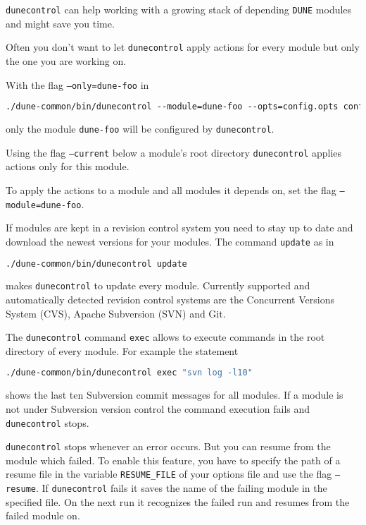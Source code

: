 \documentclass[11pt,a4paper,headinclude,footinclude,DIV16,normalheadings]{scrartcl}
\newcommand{\dune}{\texttt{DUNE}\xspace}
\newcommand{\dunecontrol}{\texttt{dunecontrol}\xspace}
\begin{document}
\dunecontrol can help working with a growing stack of depending \dune modules and
might save you time.

\minisec{Narrow down \dune modules to apply actions to}
Often you don't want to let \dunecontrol apply actions for every module but only 
the one you are working on.

With the flag \texttt{--only=dune-foo} in
\begin{lstlisting}[language=make]
./dune-common/bin/dunecontrol --module=dune-foo --opts=config.opts configure
\end{lstlisting}
only the module \texttt{dune-foo} will be configured by \dunecontrol.

Using the flag \texttt{--current} below a module's root directory \dunecontrol 
applies actions only for this module.

To apply the actions to a module and all modules it depends on, set the flag 
\texttt{--module=dune-foo}.

If modules are kept in a revision control system you need to stay up to
date and download the newest versions for your modules. The command \texttt{update}
as in
\begin{lstlisting}[language=make]
./dune-common/bin/dunecontrol update
\end{lstlisting}
makes \dunecontrol to update every module. Currently supported and automatically detected 
revision control systems are the Concurrent Versions System (CVS), Apache 
Subversion (SVN) and Git.

The \dunecontrol command \texttt{exec} allows to execute commands in the root
directory of every module. For example the 
statement
\begin{lstlisting}[language=make,showstringspaces=false]
./dune-common/bin/dunecontrol exec "svn log -l10"
\end{lstlisting}
shows the last ten Subversion commit messages for all modules. If a module is 
not under Subversion version control the command execution fails and \dunecontrol 
stops.

\dunecontrol stops whenever an error occurs. But you can resume from the module which
failed. To enable this feature, you have to specify the path of a resume file in the 
variable \texttt{RESUME\_FILE} of your options file and use the flag \texttt{--resume}.
If \dunecontrol fails it saves the name of the failing module in the specified file.
On the next run it recognizes the failed run and resumes from the failed module on.
\end{document}
